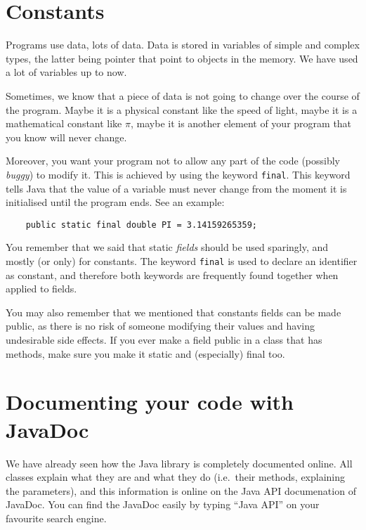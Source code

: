 
\section{Constants}
\label{sec:constants}

Programs use data, lots of data. Data is stored in variables of simple
and complex types, the latter being pointer that point to objects in
the memory. We have used a lot of variables up to now. 

Sometimes, we know that a piece of data is not going to change over
the course of the program. Maybe it is a physical constant like the
speed of light, maybe it is a mathematical constant like $\pi$, maybe
it is another element of your program that you know will never
change. 

Moreover, you want your program not to allow any part
of the code (possibly \emph{buggy}) to modify it. This is achieved by
using the keyword \verb+final+. This keyword tells Java that the value
of a variable must never change from the moment it is initialised
until the program ends. See an example: 

\begin{verbatim}
    public static final double PI = 3.14159265359; 
\end{verbatim}

You remember that we said that static \emph{fields} should be used
sparingly, and mostly (or only) for constants. The keyword
\verb+final+ is used to declare an identifier as constant, and
therefore both keywords are frequently found together when applied to
fields. 

You may also remember that we mentioned that constants fields can be
made public, as there is no risk of someone modifying their values and
having undesirable side effects. If you ever make a field public in a
class that has methods, make sure you make it static and (especially)
final too.

\section{Documenting your code with JavaDoc}
\label{sec:docum-your-code}


We have already seen how the Java library is completely documented
online. All classes explain what they are and what they do (i.e.~their
methods, explaining the parameters), and this information is online on
the Java API documenation of JavaDoc. You can find the JavaDoc easily
by typing ``Java API'' on your favourite search engine. 

